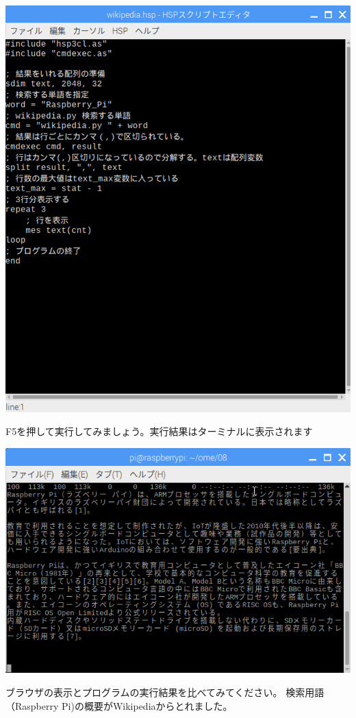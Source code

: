 \begin{center}
\includegraphics[width=\textwidth]{./text08-img/img00060.png}

\end{center}

\bigskip

\clearpage
F5を押して実行してみましょう。実行結果はターミナルに表示されます



\begin{center}
\includegraphics[width=\textwidth]{./text08-img/textbook-img061.png}

\end{center}
ブラウザの表示とプログラムの実行結果を比べてみてください。
検索用語（Raspberry
Pi)の概要がWikipediaからとれました。



